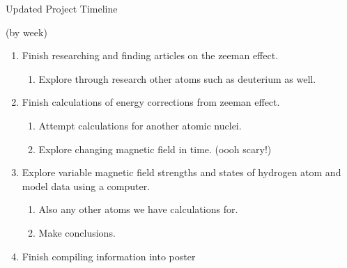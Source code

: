 \documentclass[11pt]{article}
\begin{document}
\begin{center}
	{\Large Updated Project Timeline}
\end{center}
(by week)
\begin{enumerate}
	\item Finish researching and finding articles on the zeeman effect.
	\begin{enumerate}
		\item Explore through research other atoms such as deuterium as well.
	\end{enumerate} 
	\item Finish calculations of energy corrections from zeeman effect. 
	\begin{enumerate}
		\item Attempt calculations for another atomic nuclei.
		\item Explore changing magnetic field in time. (oooh scary!)
	\end{enumerate}
	\item Explore variable magnetic field strengths and states of hydrogen atom and model data using a computer.
	\begin{enumerate}
		\item Also any other atoms we have calculations for.
		\item Make conclusions.
	\end{enumerate}
	\item Finish compiling information into poster
\end{enumerate}



\end{document}
